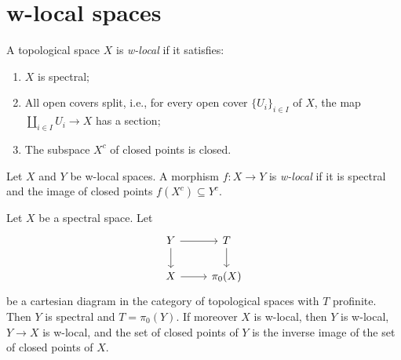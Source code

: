 \section{w-local spaces}

\begin{definition}
    \label{def:w-local-space}
    \leanok
    A topological space \(X\) is \emph{w-local} if it satisfies:
    \begin{enumerate}
        \item \(X\) is spectral;
        \item All open covers split, i.e., for every open cover \(\{U_i\}_{i \in I}\) of \(X\), the map \(\coprod_{i \in I} U_i \to X\) has a section;
        \item The subspace \(X^c\) of closed points is closed.
    \end{enumerate}
\end{definition}

\begin{definition}
    Let \(X\) and \(Y\) be w-local spaces. A morphism \(f: X \to Y\) is \emph{w-local} if it is spectral and the image of closed points \(f(X^c) \subseteq Y^c\).
    \label{def:w-local-space-map}
    \leanok
\end{definition}

\begin{lemma}
Let $X$ be a spectral space. Let
\[
\begin{tikzcd}
Y \arrow[r] \arrow[d] & T \arrow[d] \\
X \arrow[r] & \pi_0(X)
\end{tikzcd}
\]
be a cartesian diagram in the category of topological spaces with $T$ profinite. Then $Y$ is spectral and $T = \pi_0(Y)$. If moreover $X$ is w-local, then $Y$ is w-local, $Y \to X$ is w-local, and the set of closed points of $Y$ is the inverse image of the set of closed points of $X$.
\label{thm:cartesian-w-local}
\end{lemma}

